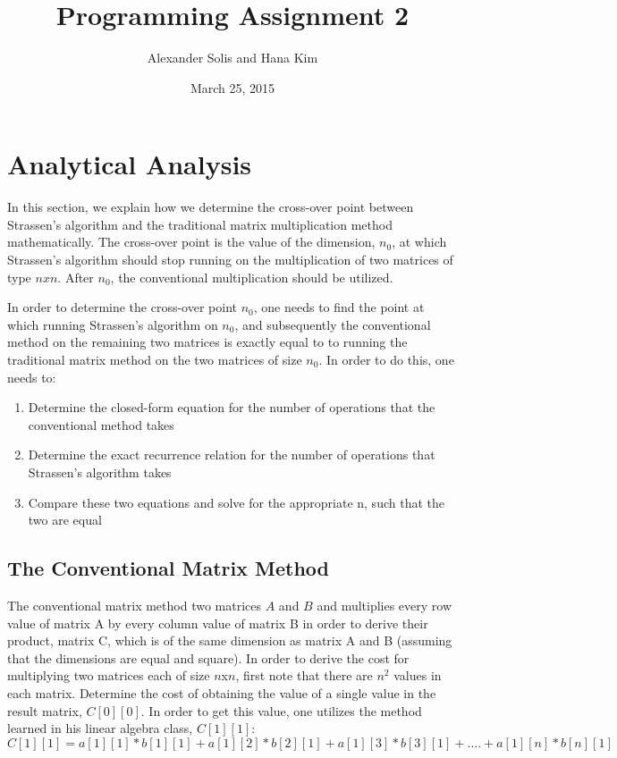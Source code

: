 \documentclass[]{article}
\begin{document}
\title{Programming Assignment 2}
\author{Alexander Solis and Hana Kim}
\date{March 25, 2015}
\maketitle

\section{Analytical Analysis}
In this section, we explain how we determine the cross-over point between Strassen's algorithm and the traditional matrix multiplication method mathematically.  The cross-over point is the value of the dimension, $n_0$, at which Strassen's algorithm should stop running on the multiplication of two matrices of type $nxn$.  After $n_0$, the conventional multiplication should be utilized.  

In order to determine the cross-over point $n_0$, one needs to find the point at which running Strassen's algorithm on $n_0$, and subsequently the conventional method on the remaining two matrices is exactly equal to to running the traditional matrix method on the two matrices of size $n_0$.  In order to do this, one needs to: 

\begin{enumerate}
\item Determine the closed-form equation for the number of operations that the conventional method takes 
\item Determine the exact recurrence relation for the number of operations that Strassen's algorithm takes
\item Compare these two equations and solve for the appropriate n, such that the two are equal
\end{enumerate}

\subsection{The Conventional Matrix Method}
The conventional matrix method two matrices $A$ and $B$ and multiplies every row value of matrix A  by every column value of matrix B in order to derive their product, matrix C, which is of the same dimension as matrix A and B (assuming that the dimensions are equal and square).  In order to derive the cost for multiplying two matrices each of size $n $x$ n$, first note that there are $n^2$ values in each matrix.  Determine the cost of obtaining the value of a single value in the result matrix, $C[0][0]$.  In order to get this value, one utilizes the method learned in his linear algebra class, $C[1][1]$: $$C[1][1] = a[1][1]*b[1][1] + a[1][2]*b[2][1] + a[1][3]*b[3][1] + .... + a[1][n]*b[n][1]$$
\end{document}
